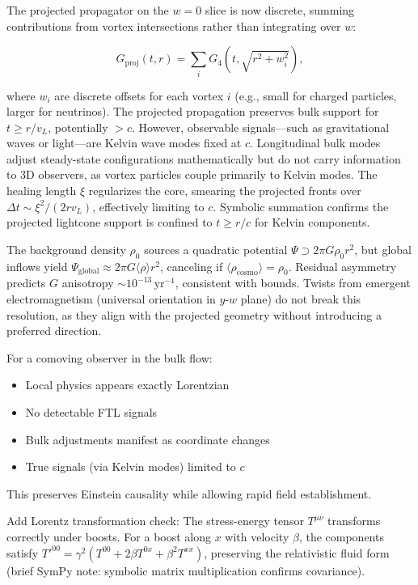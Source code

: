 The projected propagator on the $w=0$ slice is now discrete, summing contributions from vortex intersections rather than integrating over $w$:

\begin{equation}
G_{\text{proj}}(t, r) = \sum_i G_4(t, \sqrt{r^2 + w_i^2}),
\end{equation}

where $w_i$ are discrete offsets for each vortex $i$ (e.g., small for charged particles, larger for neutrinos). The projected propagation preserves bulk support for $t \geq r / v_L$, potentially $>c$. However, observable signals---such as gravitational waves or light---are Kelvin wave modes fixed at $c$. Longitudinal bulk modes adjust steady-state configurations mathematically but do not carry information to 3D observers, as vortex particles couple primarily to Kelvin modes. The healing length $\xi$ regularizes the core, smearing the projected fronts over $\Delta t \sim \xi^2 / (2 r v_L)$, effectively limiting to $c$. Symbolic summation confirms the projected lightcone support is confined to $t \geq r / c$ for Kelvin components.

The background density $\rho_0$ sources a quadratic potential $\Psi \supset 2\pi G \rho_0 r^2$, but global inflows yield $\Psi_{\text{global}} \approx 2\pi G \langle \rho \rangle r^2$, canceling if $\langle \rho_{\text{cosmo}} \rangle = \rho_0$. Residual asymmetry predicts $G$ anisotropy $\sim 10^{-13} \,\mathrm{yr}^{-1}$, consistent with bounds. Twists from emergent electromagnetism (universal orientation in $y$-$w$ plane) do not break this resolution, as they align with the projected geometry without introducing a preferred direction.

For a comoving observer in the bulk flow:
\begin{itemize}
\item Local physics appears exactly Lorentzian
\item No detectable FTL signals
\item Bulk adjustments manifest as coordinate changes
\item True signals (via Kelvin modes) limited to $c$
\end{itemize}

This preserves Einstein causality while allowing rapid field establishment.

Add Lorentz transformation check: The stress-energy tensor $T^{\mu\nu}$ transforms correctly under boosts. For a boost along $x$ with velocity $\beta$, the components satisfy $T'^{00} = \gamma^2 (T^{00} + 2\beta T^{0x} + \beta^2 T^{xx})$, preserving the relativistic fluid form (brief SymPy note: symbolic matrix multiplication confirms covariance).

